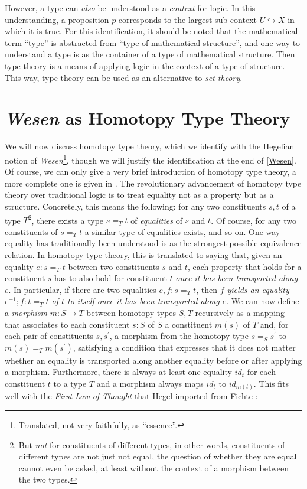 \documentclass{article}
\begin{document}
However, a type can \emph{also} be understood as a \emph{context} for logic.  In this understanding, a
proposition $p$ corresponds to the largest sub-context $U\hookrightarrow X$ in which it is true. For this
identification, it should be noted that the mathematical term ``type'' is abstracted from ``type of mathematical
structure'', and one way to understand a type is as the container of a type of mathematical structure.
Then type theory is a means of applying logic in the context of a type of structure. This way, type theory
can be used as an alternative to \emph{set theory}.


\section{\emph{Wesen} as Homotopy Type Theory}\label{Hott}
We will now discuss homotopy type theory, which we identify with the Hegelian notion of \emph{Wesen}\footnote{Translated,
not very faithfully, as ``essence''.}, though we will justify the identification at the end of \ref{Wesen}.
Of course, we can only give a very brief introduction of homotopy type theory, a more complete one is
given in \cite{Shuhott}. The revolutionary advancement of homotopy type theory over traditional logic
is to treat equality not as a property but as a structure. Concretely, this means the following: for any
two constituents $s,t$ of a type $T$\footnote{But \emph{not} for constituents of different types, in other
words, constituents of different types are not just not equal, the question of whether they are equal
cannot even be asked, at least without the context of a morphism between the two types.}, there exists
a type $s=_T t$ of \emph{equalities} of $s$ and $t$. Of course, for any two constituents of $s=_T t$ a
similar type of equalities exists, and so on. One way equality has traditionally been understood is as
the strongest possible equivalence relation. In homotopy type theory, this is translated to saying that,
given an equality $e:s=_T t$ between two constituents $s$ and $t$, each property that holds for a constituent
$s$ has to also hold for constituent $t$ \emph{once it has been transported along $e$}. In particular,
if there are two equalities $e,f:s=_T t$, then \emph{$f$ yields an equality $e^{-1};f:t=_T t$ of $t$ to
itself once it has been transported along $e$}. We can now define a \emph{morphism} $m:S\rightarrow T$
between homotopy types $S,T$ recursively as a mapping that associates to each constituent $s:S$ of $S$
a constituent $m(s)$ of $T$ and, for each pair of constituents $s,s^{\prime}$, a morphism from the homotopy
type $s=_{S} s^{\prime}$ to $m(s)=_T m(s^{\prime})$, satisfying a condition that expresses that it does
not matter whether an equality is transported along another equality before or after applying a morphism.
Furthermore, there is always at least one equality $id_t$ for each constituent $t$ to a type $T$ and a
morphism always maps $id_t$ to $id_{m(t)}$. This fits well with the \emph{First Law of Thought} that Hegel
imported from Fichte \cite{Fichte}:
\end{document}
